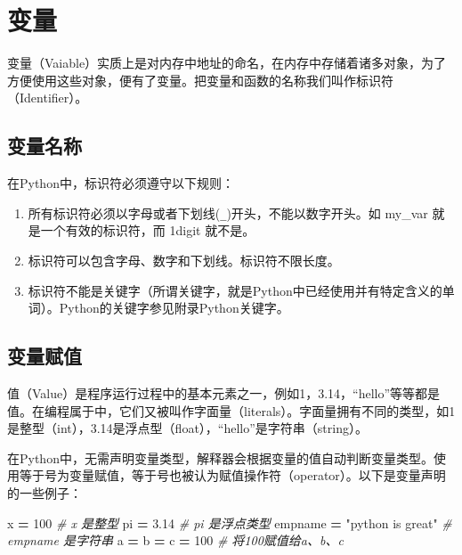 \documentclass[]{ctexbook}
\newenvironment{Shaded}{\begin{snugshade}}{\end{snugshade}}
\newcommand{\CommentTok}[1]{\textcolor[rgb]{0.56,0.35,0.01}{\textit{#1}}}
\newcommand{\DecValTok}[1]{\textcolor[rgb]{0.00,0.00,0.81}{#1}}
\newcommand{\FloatTok}[1]{\textcolor[rgb]{0.00,0.00,0.81}{#1}}
\newcommand{\NormalTok}[1]{#1}
\newcommand{\OperatorTok}[1]{\textcolor[rgb]{0.81,0.36,0.00}{\textbf{#1}}}
\newcommand{\StringTok}[1]{\textcolor[rgb]{0.31,0.60,0.02}{#1}}
\providecommand{\tightlist}{%
  \setlength{\itemsep}{0pt}\setlength{\parskip}{0pt}}
\begin{document}
\hypertarget{ux53d8ux91cf}{%
\section{变量}\label{ux53d8ux91cf}}

变量（Vaiable）实质上是对内存中地址的命名，在内存中存储着诸多对象，为了方便使用这些对象，便有了变量。把变量和函数的名称我们叫作标识符（Identifier）。

\hypertarget{ux53d8ux91cfux540dux79f0}{%
\subsection{变量名称}\label{ux53d8ux91cfux540dux79f0}}

在Python中，标识符必须遵守以下规则：

\begin{enumerate}
\def\labelenumi{\arabic{enumi}.}
\tightlist
\item
  所有标识符必须以字母或者下划线(\texttt{\_})开头，不能以数字开头。如 my\_var 就是一个有效的标识符，而 1digit 就不是。
\item
  标识符可以包含字母、数字和下划线。标识符不限长度。
\item
  标识符不能是关键字（所谓关键字，就是Python中已经使用并有特定含义的单词）。Python的关键字参见附录Python关键字。
\end{enumerate}

\hypertarget{ux53d8ux91cfux8d4bux503c}{%
\subsection{变量赋值}\label{ux53d8ux91cfux8d4bux503c}}

值（Value）是程序运行过程中的基本元素之一，例如1，3.14，``hello''等等都是值。在编程属于中，它们又被叫作字面量（literals）。字面量拥有不同的类型，如1是整型（int），3.14是浮点型（float），``hello''是字符串（string）。

在Python中，无需声明变量类型，解释器会根据变量的值自动判断变量类型。使用等于号为变量赋值，等于号也被认为赋值操作符（operator）。以下是变量声明的一些例子：

\begin{Shaded}
\begin{Highlighting}[]
\NormalTok{x }\OperatorTok{=} \DecValTok{100}                       \CommentTok{# x 是整型}
\NormalTok{pi }\OperatorTok{=} \FloatTok{3.14}                     \CommentTok{# pi 是浮点类型}
\NormalTok{empname }\OperatorTok{=} \StringTok{"python is great"}   \CommentTok{# empname 是字符串}
\NormalTok{a }\OperatorTok{=}\NormalTok{ b }\OperatorTok{=}\NormalTok{ c }\OperatorTok{=} \DecValTok{100}               \CommentTok{# 将100赋值给a、b、c}
\end{Highlighting}
\end{Shaded}
\end{document}

